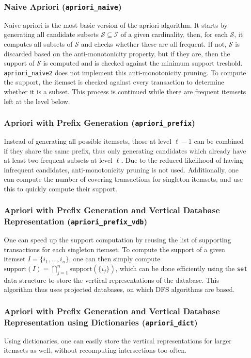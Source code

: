 \documentclass[journal, 9pt]{IEEEtran}
\theoremstyle{definition}
\newcommand{\py}[1]{\texttt{#1}}
\newcommand{\is}{\mathcal{I}}
\begin{document}
\subsubsection{Naive Apriori (\py{apriori_naive})}
Naive apriori is the most basic version of the apriori algorithm.
It starts by generating all candidate subsets \(\mathcal{S} \subseteq \is\) of a given cardinality, then, for each \(\mathcal{S}\), it computes all subsets of \(\mathcal{S}\) and checks whether these are all frequent.
If not, \(\mathcal{S}\) is discarded based on the anti-monotonicity property, but if they are, then the support of \(\mathcal{S}\) is computed and is checked against the minimum support treshold.
\py{apriori_naive2} does not implement this anti-monotonicity pruning.
To compute the support, the itemset is checked against every transaction to determine whether it is a subset.
This process is continued while there are frequent itemsets left at the level below.

\subsubsection{Apriori with Prefix Generation (\py{apriori_prefix})}
Instead of generating all possible itemsets, those at level \(\ell-1\) can be combined if they share the same prefix, thus only generating candidates which already have at least two frequent subsets at level \(\ell\).
Due to the reduced likelihood of having infrequent candidates, anti-monotonicity pruning is not used.
Additionally, one can compute the number of covering transactions for singleton itemsets, and use this to quickly compute their support.

\subsubsection{Apriori with Prefix Generation and Vertical Database Representation (\py{apriori_prefix_vdb})}
One can speed up the support computation by reusing the list of supporting transactions for each singleton itemset.
To compute the support of a given itemset \(I = \{i_1, \ldots, i_n\}\), one can then simply compute \(\mathrm{support}(I) = \bigcap_{j = 1}^{n} \mathrm{support}(\{i_j\})\),
which can be done efficiently using the \py{set} data structure to store the vertical representations of the database.
This algorithm thus uses projected databases, on which DFS algorithms are based.

\subsubsection{Apriori with Prefix Generation and Vertical Database Representation using Dictionaries (\py{apriori_dict})}
\label{sec:apriori_dict}
Using dictionaries, one can easily store the vertical representations for larger itemsets as well, without recomputing intersections too often.
\end{document}

